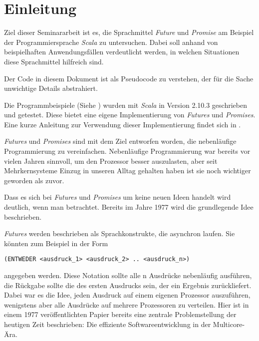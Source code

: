 \section{Einleitung}

Ziel dieser Seminararbeit ist es, die Sprachmittel \emph{Future}
und \emph{Promise} am Beispiel der Programmiersprache \emph{Scala}
zu untersuchen. Dabei soll anhand von beispielhaften Anwendungsfällen
verdeutlicht werden, in welchen Situationen diese Sprachmittel
hilfreich sind.

Der Code in diesem Dokument ist als Pseudocode zu verstehen, der für die
Sache unwichtige Details abstrahiert.

Die Programmbeispiele (Siehe \cite{code}) wurden mit
\emph{Scala} in Version 2.10.3 geschrieben und getestet. Diese bietet
eine eigene Implementierung von \emph{Futures} und \emph{Promises}.
Eine kurze Anleitung zur Verwendung dieser Implementierung findet sich in
\cite{sip14}.

\emph{Futures} und \emph{Promises} sind mit dem Ziel entworfen worden,
die nebenläufige Programmierung zu vereinfachen. Nebenläufige Programmierung
war bereits vor vielen Jahren sinnvoll, um den Prozessor besser auszulasten,
aber seit Mehrkernsysteme Einzug in unseren Alltag gehalten haben
ist sie noch wichtiger geworden als zuvor.

Dass es sich bei \emph{Futures} und \emph{Promises} um keine neuen
Ideen handelt wird deutlich, wenn man \cite{Baker:1977:IGC:872734.806932}
betrachtet. Bereits im Jahre 1977 wird die grundlegende Idee beschrieben.

\emph{Futures} werden beschrieben als Sprachkonstrukte, die asynchron laufen. Sie 
könnten zum Beispiel in der Form 
\begin{lstlisting}
(ENTWEDER <ausdruck_1> <ausdruck_2> .. <ausdruck_n>)
\end{lstlisting}
angegeben werden. Diese Notation sollte alle n Ausdrücke nebenläufig ausführen, 
die Rückgabe sollte die des ersten Ausdrucks sein, der ein Ergebnis zurückliefert.
Dabei war es die Idee, jeden Ausdruck auf einem eigenen Prozessor auszuführen, 
wenigstens aber alle Ausdrücke auf mehrere Prozessoren zu verteilen. Hier ist in 
einem 1977 veröffentlichten Papier bereits eine zentrale Problemstellung der 
heutigen Zeit beschrieben: Die effiziente Softwareentwicklung in der Multicore-Ära.
